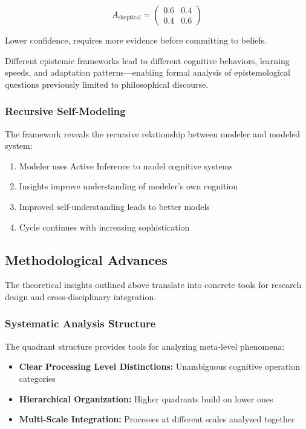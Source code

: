 \documentclass[
]{article}
\providecommand{\tightlist}{%
  \setlength{\itemsep}{0pt}\setlength{\parskip}{0pt}}
\begin{document}
\begin{equation}
A_{\text{skeptical}} = \begin{pmatrix} 0.6 & 0.4 \\ 0.4 & 0.6 \end{pmatrix}
\label{eq:skeptical_framework}
\end{equation}

Lower confidence, requires more evidence before committing to beliefs.

Different epistemic frameworks lead to different cognitive behaviors,
learning speeds, and adaptation patterns---enabling formal analysis of
epistemological questions previously limited to philosophical discourse.

\subsubsection{Recursive Self-Modeling}\label{recursive-self-modeling}

The framework reveals the recursive relationship between modeler and
modeled system:

\begin{enumerate}
\def\labelenumi{\arabic{enumi}.}
\tightlist
\item
  Modeler uses Active Inference to model cognitive systems
\item
  Insights improve understanding of modeler's own cognition
\item
  Improved self-understanding leads to better models
\item
  Cycle continues with increasing sophistication
\end{enumerate}

\subsection{Methodological Advances}\label{sec:methodological_advances}

The theoretical insights outlined above translate into concrete tools
for research design and cross-disciplinary integration.

\subsubsection{Systematic Analysis
Structure}\label{systematic-analysis-structure}

The quadrant structure provides tools for analyzing meta-level
phenomena:

\begin{itemize}
\tightlist
\item
  \textbf{Clear Processing Level Distinctions:} Unambiguous cognitive
  operation categories
\item
  \textbf{Hierarchical Organization:} Higher quadrants build on lower
  ones
\item
  \textbf{Multi-Scale Integration:} Processes at different scales
  analyzed together
\end{itemize}
\end{document}
